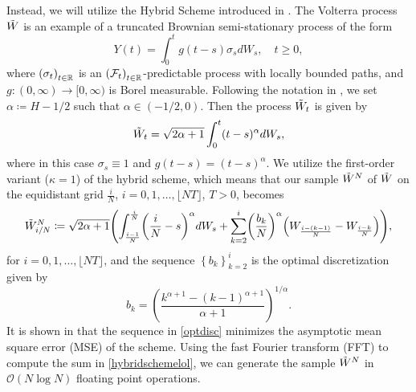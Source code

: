 Instead, we will utilize the Hybrid Scheme introduced in \cite{hybrid}. The Volterra process $\Tilde{W}$ is an example of a truncated Brownian semi-stationary process of the form
\begin{equation}
    Y(t)=\int_{0}^{t}g(t-s)\sigma_{s}dW_{s}, \quad t\geq 0,
\end{equation}
where $\left(\sigma_{t}\right)_{t\in\R}$ is an $\left(\mathcal{F}_{t}\right)_{t\in\R}$-predictable process with locally bounded paths, and $g:(0,\infty)\to [0,\infty)$ is Borel measurable. Following the notation in \cite{hybrid}, we set $\alpha\coloneqq H-1/2$ such that $\alpha\in (-1/2,0)$. Then the process $\Tilde{W}_{t}$ is given by
\begin{equation}
    \Tilde{W}_{t}=\sqrt{2\alpha +1}\int_{0}^{t}(t-s)^{\alpha}dW_{s},
\end{equation}
where in this case $\sigma_{s}\equiv 1$ and $g(t-s)=(t-s)^{\alpha}$. We utilize the first-order variant ($\kappa=1$) of the hybrid scheme, which means that our sample $\Tilde{W}^{N}$ of $\Tilde{W}$ on the equidistant grid $\frac{i}{N}$, $i=0,1,\dots, \lfloor NT\rfloor$, $T>0$, becomes
\begin{equation}\label{hybridschemelol}
    \Tilde{W}_{i/N}^{N}\coloneqq \sqrt{2\alpha +1}\left(\int_{\frac{i-1}{N}}^{\frac{i}{N}}\left(\frac{i}{N}-s\right)^{\alpha}dW_{s}+\sum_{k=2}^{i}\left(\frac{b_{k}}{N}\right)^{\alpha}\left(W_{\frac{i-(k-1)}{N}}-W_{\frac{i-k}{N}}\right)\right),
\end{equation}
for $i=0,1,\dots,\lfloor NT\rfloor$, and the sequence $\left\{b_{k}\right\}_{k=2}^{i}$ is the optimal discretization given by
\begin{equation}\label{optdisc}
    b_{k}= \left(\frac{k^{\alpha+1}-(k-1)^{\alpha + 1}}{\alpha +1}\right)^{1/\alpha}.
\end{equation}
It is shown in \cite{hybrid} that the sequence in \eqref{optdisc} minimizes the asymptotic mean square error (MSE) of the scheme. Using the fast Fourier transform (FFT) to compute the sum in \eqref{hybridschemelol}, we can generate the sample $\Tilde{W}^{N}$ in $\mathcal{O}(N\log N)$ floating point operations.

